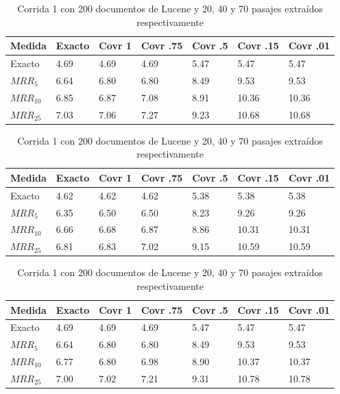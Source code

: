 \begin{table}
\centering
\begin{center}
\begin{tabular}{|l | l | l | l | l | l | l |}
\hline
Medida & Exacto & Covr 1 & Covr .75 & Covr .5 & Covr .15 & Covr .01 \\ \hline
Exacto & 4.69 & 4.69 & 4.69 & 5.47 & 5.47 & 5.47  \\ \hline
$MRR_{5}$ & 6.64 & 6.80 & 6.80 & 8.49 & 9.53 & 9.53  \\ \hline
$MRR_{10}$ & 6.85 & 6.87 & 7.08 & 8.91 & 10.36 & 10.36  \\ \hline
$MRR_{25}$ & 7.03 & 7.06 & 7.27 & 9.23 & 10.68 & 10.68  \\ \hline
\end{tabular}

\medskip

\begin{tabular}{|l | l | l | l | l | l | l |}
\hline
Medida & Exacto & Covr 1 & Covr .75 & Covr .5 & Covr .15 & Covr .01 \\ \hline
Exacto & 4.62 & 4.62 & 4.62 & 5.38 & 5.38 & 5.38  \\ \hline
$MRR_{5}$ & 6.35 & 6.50 & 6.50 & 8.23 & 9.26 & 9.26  \\ \hline
$MRR_{10}$ & 6.66 & 6.68 & 6.87 & 8.86 & 10.31 & 10.31  \\ \hline
$MRR_{25}$ & 6.81 & 6.83 & 7.02 & 9.15 & 10.59 & 10.59  \\ \hline
\end{tabular}

\medskip

\begin{tabular}{|l | l | l | l | l | l | l |}
\hline
Medida & Exacto & Covr 1 & Covr .75 & Covr .5 & Covr .15 & Covr .01 \\ \hline
Exacto & 4.69 & 4.69 & 4.69 & 5.47 & 5.47 & 5.47  \\ \hline
$MRR_{5}$ & 6.64 & 6.80 & 6.80 & 8.49 & 9.53 & 9.53  \\ \hline
$MRR_{10}$ & 6.77 & 6.80 & 6.98 & 8.90 & 10.37 & 10.37  \\ \hline
$MRR_{25}$ & 7.00 & 7.02 & 7.21 & 9.31 & 10.78 & 10.78  \\ \hline
\end{tabular}
\caption{Corrida 1 con 200 documentos de Lucene y 20, 40 y 70 pasajes extraídos respectivamente}
\label{table:1_200_getExactMRRWikiFactoid_getCovrMRRWikiFactoid}
\end{center}
\end{table}

